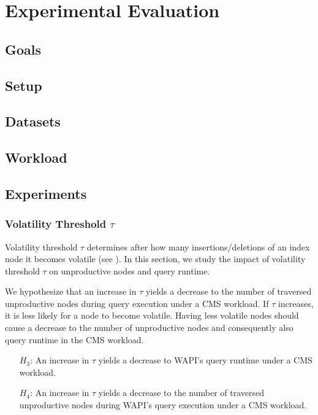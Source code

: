 \documentclass[abstracton,12pt]{scrartcl}
\theoremstyle{definition}
\begin{document}
\section{Experimental Evaluation}
\label{sec:experimental-evaluation}

\subsection{Goals}

\subsection{Setup}

\subsection{Datasets}

\subsection{Workload}

\subsection{Experiments}

\subsubsection{Volatility Threshold $\tau$}

Volatility threshold $\tau$ determines after how many insertions/deletions of an index node
it becomes volatile (see ). In this section, we study the impact of
volatility threshold $\tau$ on unproductive nodes and query runtime.

We hypothesize that an increase in $\tau$ yields a decrease to the number of
traversed unproductive nodes during query execution under a CMS workload. If
$\tau$ increases, it is
less likely for a node to become volatile. Having less volatile nodes should
cause a decrease to the number of unproductive nodes and consequently also query
runtime in the CMS workload.

\begin{shaded}
  \begin{itemize}
  \item[$H_3$:] An increase in $\tau$ yields a decrease to WAPI's query runtime
    under a CMS workload. 
  \item[$H_4$:] An increase in $\tau$ yields a decrease to the number of
    traversed unproductive nodes during WAPI's query execution under a CMS workload.
  \end{itemize}
\end{shaded}
\end{document}
